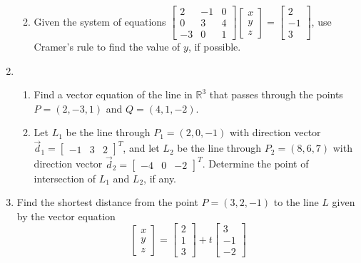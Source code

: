 \documentclass[12pt]{article}
\newcommand{\points}[1]{\marginpar{\hspace{24pt}[#1]}}
\newcommand{\R}{\mathbb{R}}
\begin{document}
\begin{enumerate}
\begin{enumerate}
\vspace{3.5in}

 \item Given the system of equations $\begin{bmatrix}2&-1&0\\0&3&4\\-3&0&1\end{bmatrix}\begin{bmatrix}x\\y\\z\end{bmatrix} =\begin{bmatrix}2\\-1\\3\end{bmatrix}$, use Cramer's rule to find the value of $y$, if possible. \points{5}
\end{enumerate}


\newpage

\item \begin{enumerate}
       \item Find a vector equation of the line in $\R^3$ that passes through the points $P=(2,-3,1)$ and $Q=(4,1,-2)$. \points{4}

\vspace{2.5in}

       \item Let $L_1$ be the line through $P_1=(2,0,-1)$ with direction vector $\vec{d}_1 = \begin{bmatrix}-1&3&2\end{bmatrix}^T$, and let $L_2$ be the line through $P_2=(8,6,7)$ with direction vector $\vec{d}_2=\begin{bmatrix}-4&0&-2\end{bmatrix}^T$. Determine the point of intersection of $L_1$ and $L_2$, if any.\points{6}
      \end{enumerate}




\newpage
\item Find the shortest distance from the point $P=(3,2,-1)$ to the line $L$ given by the vector equation \points{5}
\[
\begin{bmatrix}x\\y\\z\end{bmatrix} = \begin{bmatrix}2\\1\\3\end{bmatrix} + t\begin{bmatrix}3\\-1\\-2\end{bmatrix}
\]


\end{enumerate}
\end{document}
